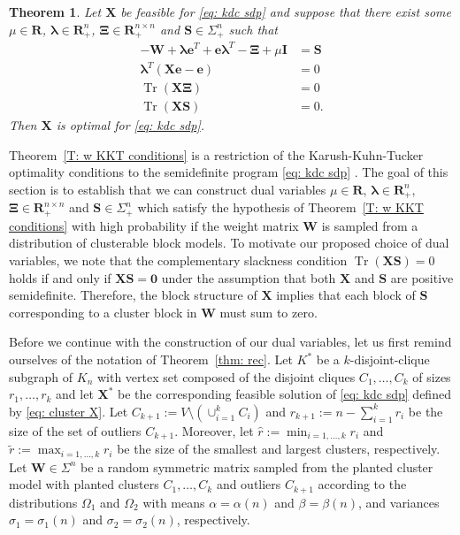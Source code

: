 \documentclass[twoside,11pt]{article}
\newtheorem{theorem}{Theorem}[section]
\renewcommand{\S}{\mathbf{S}}
\newcommand{\R}{\mathbf{R}}
\DeclareMathOperator{\tr}{{Tr}}
\newcommand{\e}{\bs {e}}
\newcommand{\bs}{\boldsymbol}
\newcommand{\X}{\bs {X}}
\newcommand{\W}{\bs {W}}
\newcommand{\0}{\bs{0}}
\begin{document}
{\renewcommand{\S}{\bs{S}}
\begin{theorem}
	\label{T:  w KKT conditions}
	Let $\X$ be feasible for \eqref{eq: kdc sdp} and suppose that 
	there exist some $\mu \in \R$, $\bs\lambda \in \R^n_+$, $\bs\Xi \in \R^{n\times n}_{+}$ and $\S \in \Sigma^n_+$ such that
	\begin{align}
	- \W + \bs\lambda \e^T + \e \bs\lambda^T - \bs\Xi + \mu \bs I &= \S \label{E: w dual feas} \\
	\bs\lambda^T (\X\e - \e)  &= 0  \label{E: w CS rowsum} \\		
	\tr(\X  \bs\Xi) &= 0 \label{E: w CS nonneg} \\
	\tr (\X \S)  &= 0. \label{E: w CS sdp}
	\end{align}
	Then $\X$ is optimal for \eqref{eq: kdc sdp}.
\end{theorem}

Theorem~\ref{T: w KKT conditions} is a restriction of the Karush-Kuhn-Tucker optimality conditions
to the semidefinite program \eqref{eq: kdc sdp} \citep[see for example][Section 5.5.3]{boyd2009convex}.
The goal of this section is to establish that we can construct dual variables $\mu \in \R$, $\bs\lambda \in \R^n_+$, $\bs\Xi \in \R^{n\times n}_{+}$ and $\S \in \Sigma^n_+$ 
which satisfy the hypothesis
of Theorem~\eqref{T: w KKT conditions} with high probability if the weight matrix \(\W\) is 
sampled from a distribution of clusterable block models. 
To motivate our proposed choice of dual variables, we note that
the complementary slackness condition \(\tr(\X\S) = 0\) holds if and only if \(\X\S = \bs 0\) under the assumption that
both \(\X\) and \(\S\) are positive semidefinite. 
Therefore, the block structure of \(\X\) implies that
each block of \(\S\) corresponding to a cluster block in \(\W\) must sum to zero.

Before we continue with the construction of our dual variables, let us first remind ourselves
of the notation of Theorem~\ref{thm: rec}.
Let $K^*$ be a $k$-disjoint-clique subgraph of $K_n$ with vertex set composed of the disjoint cliques $C_1, \dots, C_k$ of sizes $r_1, \dots, r_k$  and let
$\X^*$ be the corresponding feasible solution of \eqref{eq: kdc sdp} defined by \eqref{eq: cluster X}.
Let $C_{k+1} := V \setminus  (\cup^k_{i=1} C_i)$ and $r_{k+1} := n - \sum_{i=1}^k r_i$ be the size of the set 
of outliers \(C_{k+1}\).
Moreover, let $\hat r := \min_{i=1, \dots, k} r_i$ and 
\( \tilde r := \max_{i=1,\dots, k} r_i\)  be the size of the smallest and largest clusters, 
respectively.
Let $\W \in \Sigma^n$ be a random symmetric matrix 
sampled from the planted cluster model with planted clusters \(C_1, \dots, C_k\) and 
outliers \(C_{k+1}\)
according to the distributions \(\Omega_1\) and \(\Omega_2\) with means \(\alpha = \alpha(n)\) and \(\beta = \beta(n)\),
and variances \(\sigma_1 =\sigma_1(n)\) and \(\sigma_2 = \sigma_2(n)\), respectively.

}
\end{document}
